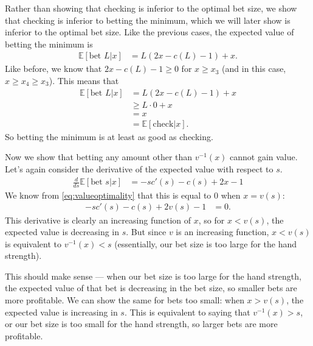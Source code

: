 \documentclass[../../main/main.tex]{subfiles}
\begin{document}
\begin{customproof}
\begin{enumerate}
\begin{enumerate}
                    Rather than showing that checking is inferior to the optimal bet size, we show that checking is inferior to betting the minimum, which we will later show is inferior to the optimal bet size. Like the previous cases, the expected value of betting the minimum is
                    \begin{align*}
                        \mathbb{E}[\text{bet } L | x] & = L(2x - c(L) - 1) + x. 
                    \end{align*}
                    Like before, we know that $2x - c(L) - 1 \geq 0$ for $x \geq x_3$ (and in this case, $x \geq x_4 \geq x_3$). This means that
                    \begin{align*}
                        \mathbb{E}[\text{bet } L | x] & = L(2x - c(L) - 1) + x \\
                        & \geq L \cdot 0 + x \\
                        & = x \\
                        &= \mathbb{E}[\text{check} | x].
                    \end{align*}
                    So betting the minimum is at least as good as checking.

                    Now we show that betting any amount other than $v^{-1}(x)$ cannot gain value.
                    Let's again consider the derivative of the expected value with respect to $s$.
                    \begin{align*}
                        \frac{d}{ds} \mathbb{E}[\text{bet } s | x] & = -s c'(s) - c(s) + 2x - 1
                    \end{align*}
                    We know from \ref{eq:valueoptimality} that this is equal to $0$ when $x = v(s)$:
                    \begin{align*}
                        -s c'(s) - c(s) + 2v(s) - 1 &= 0.
                    \end{align*} 
                    This derivative is clearly an increasing function of $x$, so for $x < v(s)$, the expected value is decreasing in $s$. But since $v$ is an increasing function, $x < v(s)$ is equivalent to $v^{-1}(x) < s$ (essentially, our bet size is too large for the hand strength).
                    
                    This should make sense --- when our bet size is too large for the hand strength, the expected value of that bet is decreasing in the bet size, so smaller bets are more profitable. We can show the same for bets too small: when $x > v(s)$, the expected value is increasing in $s$. This is equivalent to saying that $v^{-1}(x) > s$, or our bet size is too small for the hand strength, so larger bets are more profitable. 
                    

\end{enumerate}
\end{enumerate}
\end{customproof}
\end{document}
